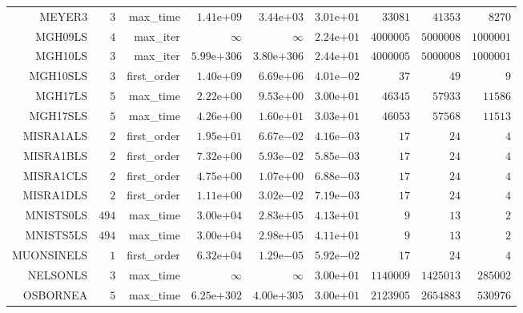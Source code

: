 \begin{longtable}{rrrrrrrrr}
MEYER3 & \(     3\) & max\_time & \( 1.41\)e\(+09\) & \( 3.44\)e\(+03\) & \( 3.01\)e\(+01\) & \( 33081\) & \( 41353\) & \(  8270\) \\
MGH09LS & \(     4\) & max\_iter & \(\infty\) & \(\infty\) & \( 2.24\)e\(+01\) & \(4000005\) & \(5000008\) & \(1000001\) \\
MGH10LS & \(     3\) & max\_iter & \(5.99\)e\(+306\) & \(3.80\)e\(+306\) & \( 2.44\)e\(+01\) & \(4000005\) & \(5000008\) & \(1000001\) \\
MGH10SLS & \(     3\) & first\_order & \( 1.40\)e\(+09\) & \( 6.69\)e\(+06\) & \( 4.01\)e\(-02\) & \(    37\) & \(    49\) & \(     9\) \\
MGH17LS & \(     5\) & max\_time & \( 2.22\)e\(+00\) & \( 9.53\)e\(+00\) & \( 3.00\)e\(+01\) & \( 46345\) & \( 57933\) & \( 11586\) \\
MGH17SLS & \(     5\) & max\_time & \( 4.26\)e\(+00\) & \( 1.60\)e\(+01\) & \( 3.03\)e\(+01\) & \( 46053\) & \( 57568\) & \( 11513\) \\
MISRA1ALS & \(     2\) & first\_order & \( 1.95\)e\(+01\) & \( 6.67\)e\(-02\) & \( 4.16\)e\(-03\) & \(    17\) & \(    24\) & \(     4\) \\
MISRA1BLS & \(     2\) & first\_order & \( 7.32\)e\(+00\) & \( 5.93\)e\(-02\) & \( 5.85\)e\(-03\) & \(    17\) & \(    24\) & \(     4\) \\
MISRA1CLS & \(     2\) & first\_order & \( 4.75\)e\(+00\) & \( 1.07\)e\(+00\) & \( 6.88\)e\(-03\) & \(    17\) & \(    24\) & \(     4\) \\
MISRA1DLS & \(     2\) & first\_order & \( 1.11\)e\(+00\) & \( 3.02\)e\(-02\) & \( 7.19\)e\(-03\) & \(    17\) & \(    24\) & \(     4\) \\
MNISTS0LS & \(   494\) & max\_time & \( 3.00\)e\(+04\) & \( 2.83\)e\(+05\) & \( 4.13\)e\(+01\) & \(     9\) & \(    13\) & \(     2\) \\
MNISTS5LS & \(   494\) & max\_time & \( 3.00\)e\(+04\) & \( 2.98\)e\(+05\) & \( 4.11\)e\(+01\) & \(     9\) & \(    13\) & \(     2\) \\
MUONSINELS & \(     1\) & first\_order & \( 6.32\)e\(+04\) & \( 1.29\)e\(-05\) & \( 5.92\)e\(-02\) & \(    17\) & \(    24\) & \(     4\) \\
NELSONLS & \(     3\) & max\_time & \(\infty\) & \(\infty\) & \( 3.00\)e\(+01\) & \(1140009\) & \(1425013\) & \(285002\) \\
OSBORNEA & \(     5\) & max\_time & \(6.25\)e\(+302\) & \(4.00\)e\(+305\) & \( 3.00\)e\(+01\) & \(2123905\) & \(2654883\) & \(530976\) \\

\end{longtable}
